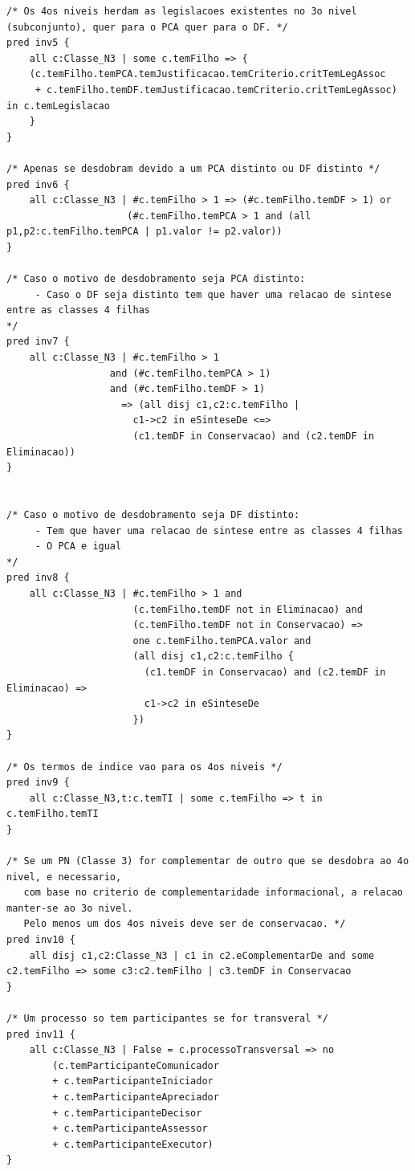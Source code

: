 \documentclass[tikz,runningheads,a4paper]{llncs}
\begin{document}
\begin{subappendices}
\begin{lstlisting}[language=alloy, frame=single]
/* Os 4os niveis herdam as legislacoes existentes no 3o nivel (subconjunto), quer para o PCA quer para o DF. */
pred inv5 {
	all c:Classe_N3 | some c.temFilho => {
	(c.temFilho.temPCA.temJustificacao.temCriterio.critTemLegAssoc 
	 + c.temFilho.temDF.temJustificacao.temCriterio.critTemLegAssoc) in c.temLegislacao
	}
}

/* Apenas se desdobram devido a um PCA distinto ou DF distinto */
pred inv6 {
	all c:Classe_N3 | #c.temFilho > 1 => (#c.temFilho.temDF > 1) or 
					 (#c.temFilho.temPCA > 1 and (all p1,p2:c.temFilho.temPCA | p1.valor != p2.valor))
}

/* Caso o motivo de desdobramento seja PCA distinto:
     - Caso o DF seja distinto tem que haver uma relacao de sintese entre as classes 4 filhas
*/
pred inv7 {
	all c:Classe_N3 | #c.temFilho > 1
                  and (#c.temFilho.temPCA > 1)
                  and (#c.temFilho.temDF > 1)
                    => (all disj c1,c2:c.temFilho |
                      c1->c2 in eSinteseDe <=>
                      (c1.temDF in Conservacao) and (c2.temDF in Eliminacao))
}


/* Caso o motivo de desdobramento seja DF distinto:
     - Tem que haver uma relacao de sintese entre as classes 4 filhas
	 - O PCA e igual
*/
pred inv8 {
	all c:Classe_N3 | #c.temFilho > 1 and 
					  (c.temFilho.temDF not in Eliminacao) and
					  (c.temFilho.temDF not in Conservacao) =>
					  one c.temFilho.temPCA.valor and
					  (all disj c1,c2:c.temFilho {
 					  	(c1.temDF in Conservacao) and (c2.temDF in Eliminacao) =>
					  	c1->c2 in eSinteseDe
					  })
}

/* Os termos de indice vao para os 4os niveis */
pred inv9 {
	all c:Classe_N3,t:c.temTI | some c.temFilho => t in c.temFilho.temTI
}

/* Se um PN (Classe 3) for complementar de outro que se desdobra ao 4o nivel, e necessario, 
   com base no criterio de complementaridade informacional, a relacao manter-se ao 3o nivel. 
   Pelo menos um dos 4os niveis deve ser de conservacao. */
pred inv10 {
	all disj c1,c2:Classe_N3 | c1 in c2.eComplementarDe and some c2.temFilho => some c3:c2.temFilho | c3.temDF in Conservacao
}

/* Um processo so tem participantes se for transveral */
pred inv11 {
	all c:Classe_N3 | False = c.processoTransversal => no 
		(c.temParticipanteComunicador 
		+ c.temParticipanteIniciador
		+ c.temParticipanteApreciador
		+ c.temParticipanteDecisor
    	+ c.temParticipanteAssessor
    	+ c.temParticipanteExecutor)
}


\end{lstlisting}
\end{subappendices}
\end{document}
